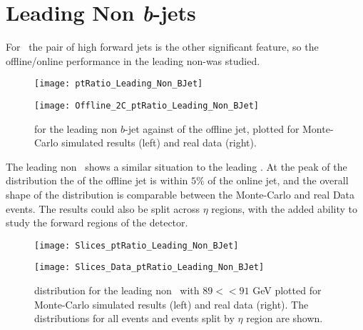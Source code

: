 \newpage
\section{Leading Non \textit{b}-jets}
	\label{OP:leadingnonb}

	For \VBFHBB\, the pair of high \pt forward jets is the other significant feature, so the offline/online performance in the leading non-\bjet was studied.

	\begin{figure}[h]
		\centering
		\begin{minipage}[h]{0.48\linewidth}
			\texttt{[image: ptRatio\_Leading\_Non\_BJet]}

		\end{minipage}
		\quad
		\begin{minipage}[h]{0.48\linewidth}
			\texttt{[image: Offline\_2C\_ptRatio\_Leading\_Non\_BJet]}
		\end{minipage}
		\caption{\dptpt for the leading \pt non $b$-jet against \pt of the offline jet, plotted for Monte-Carlo simulated results (left) and real data (right).}
		\label{fig:O:leadingnonbpt}
	\end{figure}

	The leading non \bjet\, shows a similar situation to the leading \bjet. At the peak of the \dptpt distribution the \pt of the offline jet is within $5\%$ of the online jet, and the overall shape of the distribution is comparable between the Monte-Carlo and real Data events.
	The results could also be split across $\eta$ regions, with the added ability to study the forward regions of the detector.

	\begin{figure}[h]
		\centering

		\begin{minipage}[h]{0.48\linewidth}
			\texttt{[image: Slices\_ptRatio\_Leading\_Non\_BJet]}
		\end{minipage}
		\quad
		\begin{minipage}[h]{0.48\linewidth}
			\texttt{[image: Slices\_Data\_ptRatio\_Leading\_Non\_BJet]}
		\end{minipage}
		\caption{\dptpt distribution for the leading non \bjet\, with $89<$\pt$<91$ GeV plotted for Monte-Carlo simulated results (left) and real data (right). The distributions for all events and events split by $\eta$ region are shown.}
		\label{fig:O:leadingnonbptslice}
	\end{figure}

